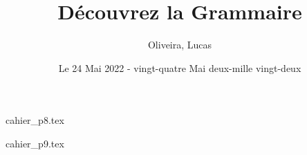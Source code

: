\documentclass{article}
\title{Découvrez la Grammaire}
\author{Oliveira, Lucas}
\date{Le 24 Mai 2022 - vingt-quatre Mai deux-mille vingt-deux}
\begin{document}
    \maketitle
    \tableofcontents

    \newpage
    {cahier_p8.tex}

    \newpage
    {cahier_p9.tex}
\end{document}
